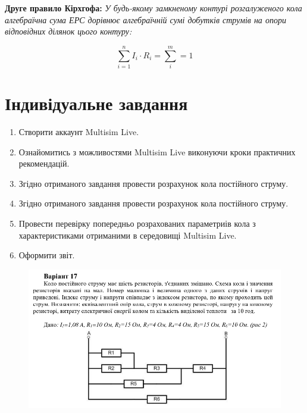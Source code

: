 \documentclass{article}
\begin{document}
\begin{normalsize}
	\textbf{Друге правило Кірхгофа:} \textit{У будь-якому замкненому контурі розгалуженого
		кола алгебраїчна сума ЕРС дорівнює алгебраїчній сумі добутків струмів на опори
		відповідних ділянок цього контуру:}
	
	\begin{equation}
		\sum_{i=1}^{n}I_i\cdot R_i=\sum_{i}^{m}=1\nonumber
	\end{equation}
	
		\section*{Індивідуальне завдання}
	\begin{enumerate}
		\item Створити аккаунт Multisim Live.
		\item Ознайомитись з можливостями Multisim Live виконуючи кроки практичних рекомендацій.
		\item Згідно отриманого завдання провести розрахунок кола постійного струму.
		\item Згідно отриманого завдання провести розрахунок кола постійного струму.
		\item Провести перевірку попередньо розрахованих параметриів кола з
		характеристиками отриманими в середовищі Multisim Live.
		\item Оформити звіт.
	\end{enumerate}
	
	\begin{figure}[H]
		\centering
		\includegraphics[scale=0.6]{v}
	\end{figure}
	

\end{normalsize}
\end{document}
